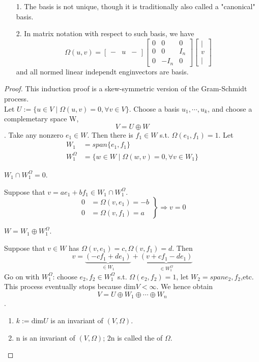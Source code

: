 \documentclass[4paper]{article}
\begin{document}
\begin{enumerate}
\item[1.] The basis is not unique, though it is traditionally also called a "canonical" basis.
\item[2.] In matrix notation with respect to such basis, we have 
\begin{equation*}
\Omega(u,v)=
\begin{bmatrix}
- & u & -
\end{bmatrix}
\begin{bmatrix}
0 & 0 & 0 \\
0 & 0 & I_n \\
0 &-I_n& 0
\end{bmatrix}
\begin{bmatrix}
| \\
v \\
|
\end{bmatrix}
\end{equation*}
and all normed linear independt enginvectors are basis. 
\end{enumerate}

\begin{proof}
This induction proof is a skew-symmetric version of the Gram-Schmidt process. \\ Let $U:=\{u\in V\mid 
\Omega(u,v)=0,\forall v\in V\}$. Choose a basis $u_1,\cdots,u_k$, and choose a complemetary space W,
$$V=U\oplus W$$. Take any nonzero $e_1\in W$. Then there is $f_1\in W$ s.t. $\Omega(e_1,f_1)=1$. Let
\begin{align*}
W_1 &= span\{e_1,f_1\} \\
W_1^{\Omega}&=\{w\in W\mid \Omega(w,v)=0,\forall v\in W_1\}
\end{align*}
\begin{claim}
$W_1\cap W_1^{\Omega}={0}$.
\end{claim}
Suppose that $v=ae_1+bf_1\in W_1\cap W_1^{\Omega}$.
\begin{equation*}
 \left.\begin{aligned}
        0&=\Omega(v,e_1)=-b\\
        0&=\Omega(v,f_1)=a
       \end{aligned}
 \right\}
 \Rightarrow v=0
\end{equation*}
\begin{claim}
$W=W_1\oplus W_1^\Omega$.
\end{claim}
Suppose that $v\in W$ has $\Omega(v,e_1)=c, \Omega(v,f_1)=d$. Then
\[
 v = \underbrace{(-cf_1+de_1)}_{\in W_1}
   + \underbrace{(v+cf_1-de_1)}_{\in W_1^\Omega}
\]
Go on with $W_1^\Omega$: choose $e_2,f_2\in W_1^\Omega$ s.t. $\Omega(e_2,f_2)=1$, let $W_2=span{e_2,
f_2}$,etc. This process eventually stops because $\mathrm{dim}V<\infty$. We hence obtain $$V=U\oplus
W_1\oplus \cdots \oplus W_n$$.
\begin{enumerate}
\item $k:=\mathrm{dim}U$ is an invariant of $(V,\Omega)$.\\
\item n is an invariant of $(V,\Omega)$; 2n is called the  of $\Omega$.
\end{enumerate}
\end{proof}
\end{document}
